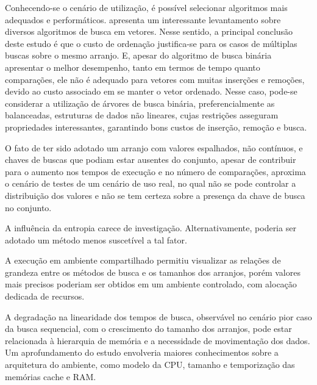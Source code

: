 \documentclass[12pt]{article}
\begin{document}
Conhecendo-se o cenário de utilização, é possível selecionar algoritmos mais adequados e performáticos. \cite{cappelle_searching_2021} apresenta um interessante levantamento sobre diversos algoritmos de busca em vetores. Nesse sentido, a principal conclusão deste estudo é que o custo de ordenação justifica-se para os casos de múltiplas buscas sobre o mesmo arranjo. E, apesar do algoritmo de busca binária apresentar o melhor desempenho, tanto em termos de tempo quanto comparações, ele não é adequado para vetores com muitas inserções e remoções, devido ao custo associado em se manter o vetor ordenado. Nesse caso, pode-se considerar a utilização de árvores de busca binária, preferencialmente as balanceadas, estruturas de dados não lineares, cujas restrições asseguram propriedades interessantes, garantindo bons custos de inserção, remoção e busca.

O fato de ter sido adotado um arranjo com valores espalhados, não contínuos, e chaves de buscas que podiam estar ausentes do conjunto, apesar de contribuir para o aumento nos tempos de execução e no número de comparações,
aproxima o cenário de testes de um cenário de uso real, no qual não se pode controlar a distribuição dos valores e não se tem certeza sobre a presença da chave de busca no conjunto.

A influência da entropia carece de investigação. Alternativamente, poderia ser adotado um método menos suscetível a tal fator.

A execução em ambiente compartilhado permitiu visualizar as relações de grandeza entre os métodos de busca e os tamanhos dos arranjos, porém valores mais precisos poderiam ser obtidos em um ambiente controlado, com alocação dedicada de recursos.

A degradação na linearidade dos tempos de busca, observável no cenário pior caso da busca sequencial, com o crescimento do tamanho dos arranjos, pode estar relacionada à hierarquia de memória e a necessidade de movimentação dos dados. Um aprofundamento do estudo envolveria maiores conhecimentos sobre a arquitetura do ambiente, como modelo da CPU, tamanho e temporização das memórias cache e RAM.



\end{document}

